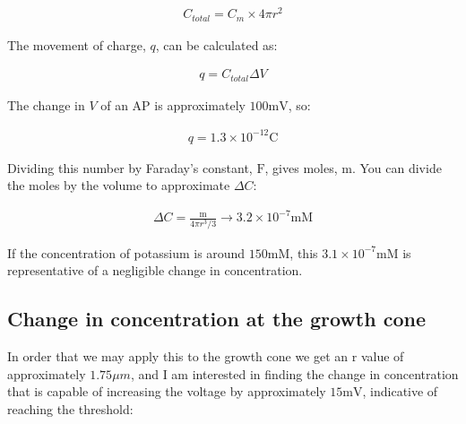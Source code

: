 \documentclass[12pt]{amsart}
\begin{document}
\begin{equation} \label{eq8}
\begin{split}
C_{total} = C_m \times 4\pi r^2
\end{split}
\end{equation}

\bigskip

    The movement of charge, $q$, can be calculated as:

\bigskip

\begin{equation} \label{eq8}
\begin{split}
q = C_{total}\Delta V
\end{split}
\end{equation}

\bigskip

    The change in $V$ of an AP is approximately $100\mathrm{mV}$, so:

\bigskip

\begin{equation} \label{eq8}
\begin{split}
q = 1.3 \times 10^{-12}\mathrm{C}
\end{split}
\end{equation}

\bigskip

    Dividing this number by Faraday's constant, $\mathrm{F}$, gives moles, $\mathrm{m}$. You can divide the moles by the volume to approximate $\Delta C$:

\begin{equation} \label{eq8}
\begin{split}
\Delta C = \frac{\mathrm{m}}{4\pi r^3 /3} \rightarrow 3.2 \times 10^{-7} \mathrm{mM}
\end{split}
\end{equation}

\bigskip

If the concentration of potassium is around $150\mathrm{mM}$, this $3.1 \times 10^{-7} \mathrm{mM}$ is representative of a negligible change in concentration. 

\subsection{Change in concentration at the growth cone} In order that we may apply this to the growth cone we get an r value of approximately $1.75 \mu m$, and I am interested in finding the change in concentration that is capable of increasing the voltage by approximately $15\mathrm{mV}$, indicative of reaching the threshold: 
\end{document}
